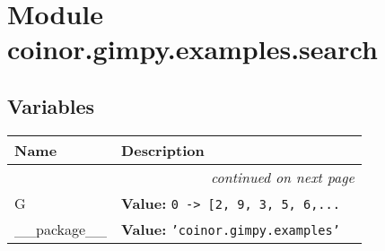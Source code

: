 %
%
%


\section{Module coinor.gimpy.examples.search}

    \label{coinor:gimpy:examples:search}


  \subsection{Variables}

    \vspace{-1cm}
\hspace{\varindent}\begin{longtable}{|p{\varnamewidth}|p{\vardescrwidth}|l}
\cline{1-2}
\cline{1-2} \centering \textbf{Name} & \centering \textbf{Description}& \\
\cline{1-2}
\endhead\cline{1-2}\multicolumn{3}{r}{\small\textit{continued on next page}}\\\endfoot\cline{1-2}
\endlastfoot\raggedright G\- & \raggedright \textbf{Value:} 
{\tt 0 -{\textgreater} [2, 9, 3, 5, 6,\texttt{...}}&\\
\cline{1-2}
\raggedright \_\-\_\-p\-a\-c\-k\-a\-g\-e\-\_\-\_\- & \raggedright \textbf{Value:} 
{\tt \texttt{'}\texttt{coinor.gimpy.examples}\texttt{'}}&\\
\cline{1-2}
\end{longtable}

